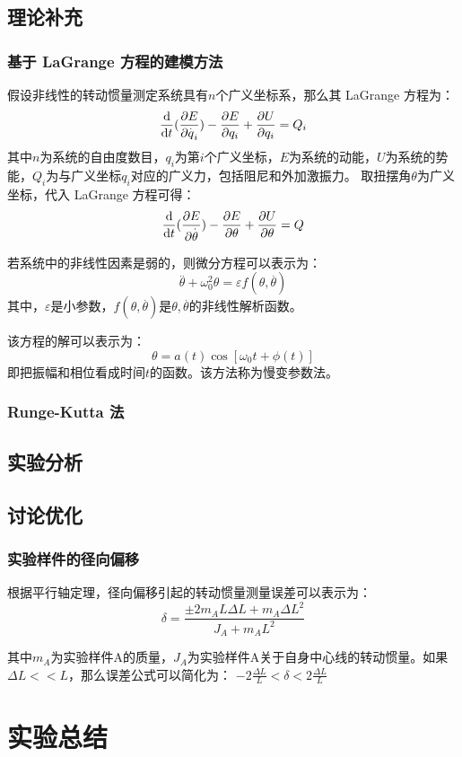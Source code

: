 \documentclass[12pt,hyperref,a4paper,UTF8]{ctexart}
\begin{document}
\subsection{理论补充}
\subsubsection{基于 LaGrange 方程的建模方法}
假设非线性的转动惯量测定系统具有$n$个广义坐标系，那么其 LaGrange 方程为：
$$ \frac{\text d}{\text dt}(\frac{\partial E}{\partial\overset{.}q_i})-\frac{\partial E}{\partial q_i}+\frac{\partial U}{\partial q_i}=Q_i $$
其中$n$为系统的自由度数目，$q_i$为第$i$个广义坐标，$E$为系统的动能，$U$为系统的势能，$Q_i$为与广义坐标$q_i$对应的广义力，包括阻尼和外加激振力。
取扭摆角$\theta$为广义坐标，代入 LaGrange 方程可得：
$$ \frac{\text d}{\text dt}(\frac{\partial E}{\partial\overset{.}\theta})-\frac{\partial E}{\partial \theta}+\frac{\partial U}{\partial \theta}=Q $$

若系统中的非线性因素是弱的，则微分方程可以表示为：
$$ \overset{..}\theta+\omega_0^2\theta=\varepsilon f(\theta,\overset{.}\theta) $$
其中，$\varepsilon$是小参数，$f(\theta,\overset{.}\theta)$是$\theta,\overset{.}\theta$的非线性解析函数。

该方程的解可以表示为：
$$ \theta=a(t)\cos[\omega_0t+\phi(t)] $$
即把振幅和相位看成时间$t$的函数。该方法称为慢变参数法。
\subsubsection{Runge-Kutta 法}


\subsection{实验分析}


\subsection{讨论优化}
\subsubsection{实验样件的径向偏移}
根据平行轴定理，径向偏移引起的转动惯量测量误差可以表示为：
$$ \delta=\frac{\pm 2m_AL\Delta L+m_A\Delta L^2}{J_A+m_AL^2} $$

其中$m_A$为实验样件A的质量，$J_A$为实验样件A关于自身中心线的转动惯量。如果$\Delta L<<L$，那么误差公式可以简化为：
$ -2\frac{\Delta L}{L}<\delta<2\frac{\Delta L}{L} $
\section{实验总结}
\end{document}
